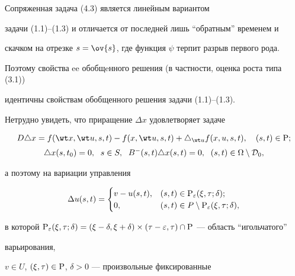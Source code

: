Сопряженная задача (4.3) является линейным вариантом


задачи (1.1)--(1.3) и отличается от последней лишь ``обратным'' временем и


скачком на отрезке $s=\ov{s}$, где функция $\psi$ терпит разрыв первого рода.


Поэтому свойства ee обобщeнного решения (в частности, оценка роста типа (3.1))


идентичны свойствам обобщенного решения задачи (1.1)--(1.3).


Нетрудно увидеть, что приращение $\Delta x$ удовлетворяет задаче


\begin{equation}


\begin{array}{c}


D\triangle x= f(\wt x,\wt u,s,t) - f(x,\wt u,s,t)+


\triangle_{\wt u} f(x,u,s,t), \quad (s,t)\in {\P}; \\[2mm]


\triangle x(s,t_{0}) = 0,\ \; s \in S,\ \; B^{-}(s,t) \triangle x(s,t)=0,


\ \; (s,t)\in\Omega\setminus {\cal D}_0,


\end{array}


\end{equation}


а поэтому на вариации управления


\begin{equation}


\Delta u(s,t) =


\begin{cases}


v - u(s,t), & (s,t)\in \P_{\varepsilon}(\xi,\tau;\delta); \\


0,& (s,t)\in P \setminus \P_{\varepsilon}(\xi,\tau;\delta),


\end{cases}


\end{equation}


в которой $\P_{\varepsilon}(\xi,\tau;\delta)=(\xi-\delta,\xi+\delta)


\times(\tau-\varepsilon,\tau)\cap \P$ --- область ``игольчатого''


варьирования,


$v\in U$, $(\xi,\tau)\in \P$, $\delta >0$ --- произвольные фиксированные



